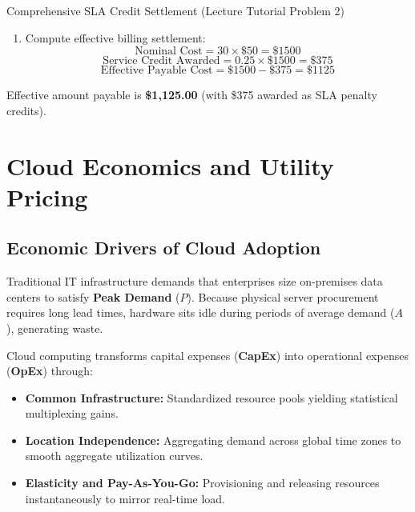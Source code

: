 \begin{solved}{Comprehensive SLA Credit Settlement (Lecture Tutorial Problem 2)}
\begin{enumerate}[leftmargin=*]
  Since $97.315\% < 99.00\%$, the violation triggers the higher \textbf{25\% Service Credit}.
  \item Compute effective billing settlement:
  \begin{equation}
  \text{Nominal Cost} = 30 \times \$50 = \$1500
  \end{equation}
  \begin{equation}
  \text{Service Credit Awarded} = 0.25 \times \$1500 = \$375
  \end{equation}
  \begin{equation}
  \text{Effective Payable Cost} = \$1500 - \$375 = \$1125
  \end{equation}
\end{enumerate}
\Answer Effective amount payable is \textbf{\$1,125.00} (with \$375 awarded as SLA penalty credits).
\end{solved}

\section{Cloud Economics and Utility Pricing}
\subsection{Economic Drivers of Cloud Adoption}
Traditional IT infrastructure demands that enterprises size on-premises data centers to satisfy \textbf{Peak Demand} ($P$). Because physical server procurement requires long lead times, hardware sits idle during periods of average demand ($A$), generating waste.

Cloud computing transforms capital expenses (\textbf{CapEx}) into operational expenses (\textbf{OpEx}) through:
\begin{itemize}[leftmargin=*]
  \item \textbf{Common Infrastructure:} Standardized resource pools yielding statistical multiplexing gains.
  \item \textbf{Location Independence:} Aggregating demand across global time zones to smooth aggregate utilization curves.
  \item \textbf{Elasticity and Pay-As-You-Go:} Provisioning and releasing resources instantaneously to mirror real-time load.
\end{itemize}

